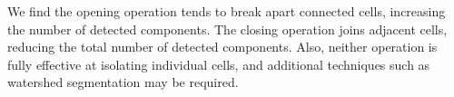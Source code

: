 \documentclass[12pt]{article}
\begin{document}
We find the opening operation tends to break apart connected cells, increasing the number of detected components. The closing operation joins adjacent cells, reducing the total number of detected components. Also, neither operation is fully effective at isolating individual cells, and additional techniques such as watershed segmentation may be required.
\end{document}
